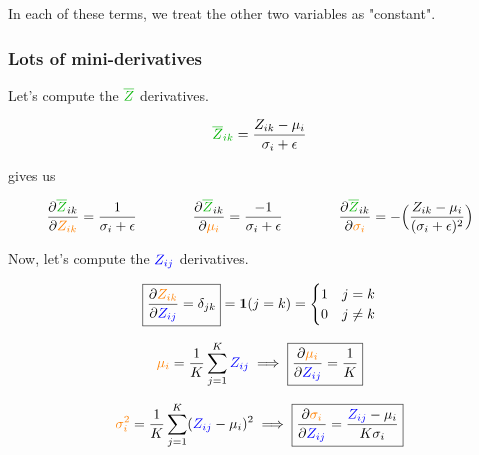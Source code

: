             In each of these terms, we treat the other two variables as "constant".

        \subsubsection{Lots of mini-derivatives}

            Let's compute the $\grn{\overline{Z}}$ derivatives.

            \begin{equation}
                \grn{\overline{Z}_{ik}}  =  \frac{ Z_{ik}   - \mu_i}{\sigma_i+\epsilon}
            \end{equation}

            gives us

            \begin{equation}
                \pderiv{\grn{\overline{Z}}_{ik}}{\org{Z_{ik}}} = 
                \frac{1}{\sigma_i+\epsilon}
                    \qquad \qquad
                \pderiv{\grn{\overline{Z}}_{ik}}{\org{\mu_i}} = 
                \frac{-1}{\sigma_i+\epsilon}
                    \qquad \qquad
                \pderiv{\grn{\overline{Z}}_{ik}}{\org{\sigma_i}} = 
                -\Big( 
                    \frac{ Z_{ik}-\mu_i  }{(\sigma_i+\epsilon)^2}
                \Big)
            \end{equation}

            Now, let's compute the $\textcolor{blue}{Z_{ij}}$ derivatives.

            \begin{equation}
                \boxed{\frac{\partial \textcolor{orange}{Z_{ik}}}{\partial \textcolor{blue}{Z_{ij}}} = \delta_{jk}} 
                =
                \mathbf{1}(j=k) = 
                \begin{cases}
                    1 & j=k \\
                    0 & j \neq k
                \end{cases}
            \end{equation}

            \begin{equation}
                \textcolor{orange}{\mu_i} =\frac{1}{K} \sum_{j=1}^K \textcolor{blue}{Z_{ij}} 
                    \implies 
                \boxed{\frac{\partial  \textcolor{orange}{\mu_i} }{\partial  \textcolor{blue}{Z_{ij}} } = \frac{1}{K}}
            \end{equation}

            \begin{equation}
                \textcolor{orange}{\sigma^2_i} = \frac{1}{K} \sum_{j=1}^K (\textcolor{blue}{Z_{ij}}-\mu_i)^2  
                    \implies 
                \boxed{\frac{\partial  \textcolor{orange}{\sigma_i} }{\partial  \textcolor{blue}{Z_{ij}} } = \frac{\textcolor{blue}{Z_{ij}}-\mu_i}{K\sigma_i}}
            \end{equation}

